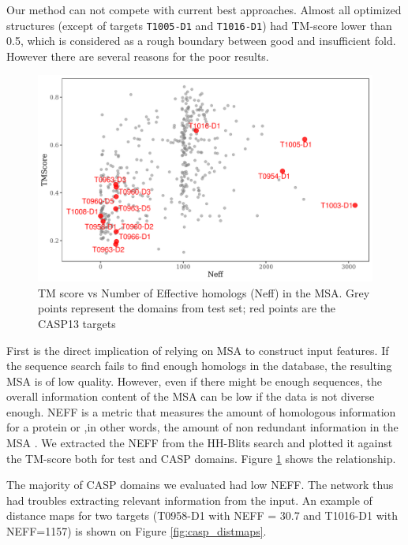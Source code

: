 Our method can not compete with current best approaches. Almost all optimized structures (except of targets \texttt{T1005-D1} and \texttt{T1016-D1}) had TM-score lower than 0.5, which is considered as a rough boundary between good and insufficient fold. However there are several reasons for the poor results.

\begin{figure}
    \centering
    \includegraphics[width=\linewidth]{imgs_tomas/tm_vs_neff.png}
    \caption{TM score vs Number of Effective homologs (Neff) in the MSA. Grey points represent the domains from test set; red points are the CASP13 targets}
    \label{fig:tm_vs_neff}
\end{figure}

First is the direct implication of relying on MSA to construct input features. If the sequence search fails to find enough homologs in the database, the resulting MSA is of low quality. However, even if there  might be enough sequences, the overall information content of the MSA can be low if the data is not diverse enough. NEFF is a metric that measures the amount of homologous information for a protein or ,in other words, the amount of non redundant information in the MSA \cite{neff}. We extracted the NEFF from the HH-Blits search and plotted it against the TM-score both for test and CASP domains. Figure \ref{fig:tm_vs_neff} shows the relationship.

The majority of CASP domains we evaluated had low NEFF. The network thus had troubles extracting relevant information from the input. An example of distance maps for two targets (T0958-D1 with NEFF = 30.7 and T1016-D1 with NEFF=1157) is shown on Figure \ref{fig:casp_distmaps}.

